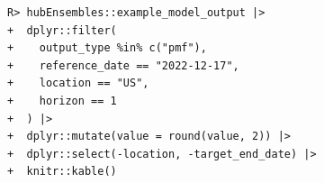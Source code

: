 \documentclass[
  article,
  shortnames,
  notitle]{jss}
\begin{document}
\begin{verbatim}
R> hubEnsembles::example_model_output |>
+  dplyr::filter(
+    output_type %in% c("pmf"),
+    reference_date == "2022-12-17",
+    location == "US",
+    horizon == 1
+  ) |>
+  dplyr::mutate(value = round(value, 2)) |>
+  dplyr::select(-location, -target_end_date) |>
+  knitr::kable()
\end{verbatim}

\begin{longtable}[]{@{}
  >{\raggedright\arraybackslash}p{}
  >{\raggedright\arraybackslash}p{}
  >{\raggedleft\arraybackslash}p{}
  >{\raggedright\arraybackslash}p{}
  >{\raggedright\arraybackslash}p{}
  >{\raggedright\arraybackslash}p{}
  >{\raggedleft\arraybackslash}p{}@{}}


\end{longtable}
\end{document}
